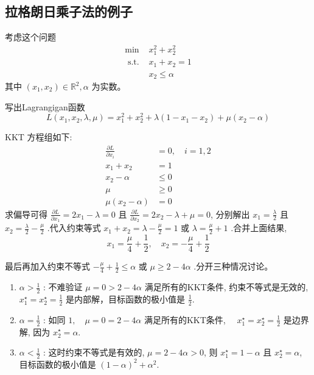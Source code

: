 \subsection{拉格朗日乘子法的例子}

\begin{problem}

    考虑这个问题
$$
\begin{array}{ll}
\min & x_{1}^{2}+x_{2}^{2} \\
\text { s.t. } & x_{1}+x_{2}=1 \\
& x_{2} \leq \alpha
\end{array}
$$
其中 $ \left(x_{1}, x_{2}\right) \in \mathbb{R}^{2}, \alpha $ 为实数。
\end{problem}

写出Lagrangigan函数
$$
L\left(x_{1}, x_{2}, \lambda, \mu\right)=x_{1}^{2}+x_{2}^{2}+\lambda\left(1-x_{1}-x_{2}\right)+\mu\left(x_{2}-\alpha\right)
$$

KKT 方程组如下:
$$
\begin{aligned}
\frac{\partial L}{\partial x_{i}} &=0, \quad i=1,2 \\
x_{1}+x_{2} &=1 \\
x_{2}-\alpha & \leq 0 \\
\mu & \geq 0 \\
\mu\left(x_{2}-\alpha\right) &=0
\end{aligned}
$$
求偏导可得 $ \frac{\partial L}{\partial x_{1}}=2 x_{1}-\lambda=0 $ 且 $ \frac{\partial L}{\partial x_{2}}=2 x_{2}-\lambda+\mu=0 $, 分别解出 $ x_{1}=\frac{\lambda}{2} $ 且 $ x_{2}=\frac{\lambda}{2}-\frac{\mu}{2} $ .代入约束等式 $ x_{1}+x_{2}=\lambda-\frac{\mu}{2}=1 $ 或 $ \lambda=\frac{\mu}{2}+1 $ .合并上面结果,
$$
x_{1}=\frac{\mu}{4}+\frac{1}{2}, \quad x_{2}=-\frac{\mu}{4}+\frac{1}{2}
$$

最后再加入约束不等式 $ -\frac{\mu}{4}+\frac{1}{2} \leq \alpha $ 或 $ \mu \geq 2-4 \alpha $ .分开三种情况讨论。

\begin{enumerate}
    \item $ \alpha>\frac{1}{2} $ : 不难验证 $ \mu=0>2-4 \alpha $ 满足所有的KKT条件, 约束不等式是无效的, $ x_{1}^{\star}=x_{2}^{\star}=\frac{1}{2} $ 是内部解，目标函数的极小值是 $ \frac{1}{2}$.
    \item $ \alpha=\frac{1}{2} $ : 如同 $ 1, \quad \mu=0=2-4 \alpha $ 满足所有的KKT条件, $ \quad x_{1}^{\star}=x_{2}^{\star}=\frac{1}{2} $ 是边界解, 因为 $ x_{2}^{\star}=\alpha $.
    \item $ \alpha<\frac{1}{2} $ : 这时约束不等式是有效的, $ \mu=2-4 \alpha>0 $, 则 $ x_{1}^{\star}=1-\alpha $ 且 $ x_{2}^{\star}=\alpha $, 目标函数的极小值是 $ (1-\alpha)^{2}+\alpha^{2} $.
\end{enumerate}

